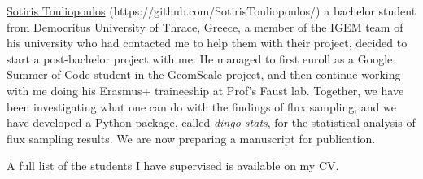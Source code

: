     \href{https://github.com/SotirisTouliopoulos/}{Sotiris Touliopoulos}
    (https://github.com/SotirisTouliopoulos/)
    a bachelor student from Democritus University of Thrace, Greece, 
    a member of the IGEM team of his university who had contacted me to help them with their project,
    decided to start a post-bachelor project with me.
    He managed to first enroll as a Google Summer of Code student in the GeomScale project,
    and then continue working with me doing his Erasmus+ traineeship at Prof's Faust lab.
    Together, we have been investigating what one can do with the findings of flux sampling, 
    and we have developed a Python package, called \textit{dingo-stats}, for the statistical analysis of flux sampling results.
    We are now preparing a manuscript for publication.

    A full list of the students I have supervised is available on my CV.


    